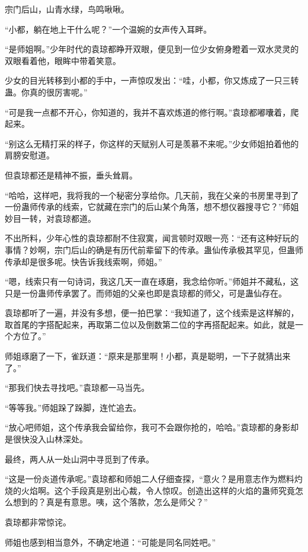 
\begin{this_body}

宗门后山，山青水绿，鸟鸣啾啾。

“小都，躺在地上干什么呢？”一个温婉的女声传入耳畔。

“是师姐啊。”少年时代的袁琼都睁开双眼，便见到一位少女俯身瞪着一双水灵灵的双眼看着他，眼眸中带着笑意。

少女的目光转移到小都的手中，一声惊叹发出：“哇，小都，你又炼成了一只三转蛊。你真的很厉害呢。”

“可是我一点都不开心，你知道的，我并不喜欢炼道的修行啊。”袁琼都嘟囔着，爬起来。

“别这么无精打采的样子，你这样的天赋别人可是羡慕不来呢。”少女师姐拍着他的肩膀安慰道。

但袁琼都还是精神不振，垂头耸肩。

“哈哈，这样吧，我将我的一个秘密分享给你。几天前，我在父亲的书房里寻到了一份蛊师传承的线索，它就藏在宗门的后山某个角落，想不想仪器搜寻它？”师姐妙目一转，对袁琼都道。

不出所料，少年心性的袁琼都耐不住寂寞，闻言顿时双眼一亮：“还有这种好玩的事情？妙啊，宗门后山的确是有历代前辈留下的传承。蛊仙传承极其罕见，但蛊师传承却是很多呢。快告诉我线索啊，师姐。”

“嗯，线索只有一句诗词，我这几天一直在琢磨，我念给你听。”师姐并不藏私，这只是一份蛊师传承罢了。而师姐的父亲也即是袁琼都的师父，可是蛊仙存在。

袁琼都听了一遍，并没有多想，便一拍巴掌：“我知道了，这个线索是这样解的，取首尾的字搭配起来，再取第二位以及倒数第二位的字再搭配起来。如此，就是一个方位了。”

师姐琢磨了一下，雀跃道：“原来是那里啊！小都，真是聪明，一下子就猜出来了。”

“那我们快去寻找吧。”袁琼都一马当先。

“等等我。”师姐跺了跺脚，连忙追去。

“放心吧师姐，这个传承我会留给你，我可不会跟你抢的，哈哈。”袁琼都的身影却是很快没入山林深处。

最终，两人从一处山洞中寻觅到了传承。

“这是一份炎道传承呢。”袁琼都和师姐二人仔细查探，“意火？是用意志作为燃料灼烧的火焰啊。这个手段真是别出心裁，令人惊叹。创造出这样的火焰的蛊师究竟怎么想到的？真是有意思。咦，这个落款，怎么是师父？”

袁琼都非常惊诧。

师姐也感到相当意外，不确定地道：“可能是同名同姓吧。”


\end{this_body}
